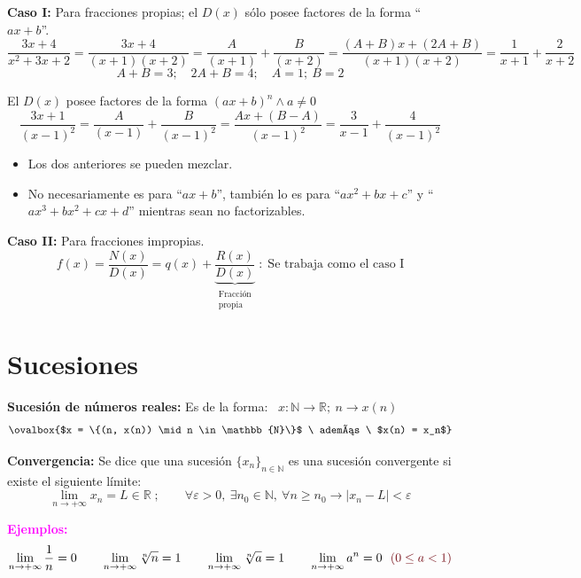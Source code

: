 \documentclass[11pt,a4paper]{article}
\begin{document}
\textcolor{azul}{\textbf{Caso I:}} Para fracciones propias; el $D(x)$ sólo posee factores de la
forma ``$ax + b$''.
\[
\frac{3x+4}{x^2+3x+2} = \frac{3x+4}{(x+1)(x+2)} = \frac{A}{(x+1)} + \frac{B}{(x+2)}
= \frac{(A+B)x + (2A+B)}{(x+1)(x+2)} = \frac{1}{x+1} + \frac{2}{x+2}
\]
\[A + B = 3;\quad 2A + B = 4;\quad A = 1;\ B = 2\]

El $D(x)$ posee factores de la forma $(ax+b)^n \wedge a \neq 0$
\[
\frac{3x+1}{(x-1)^2} = \frac{A}{(x-1)} + \frac{B}{(x-1)^2} = \frac{Ax + (B-A)}{(x-1)^2}
= \frac{3}{x-1} + \frac{4}{(x-1)^2}
\]
\begin{itemize}[label=\checkmark]
  \item Los dos anteriores se pueden mezclar.
  \item No necesariamente es para ``$ax + b$'', también lo es para ``$ax^2 + bx + c$'' y
  ``$ax^3 + bx^2 + cx + d$'' mientras sean no factorizables.
\end{itemize}

\textcolor{azul}{\textbf{Caso II:}} Para fracciones impropias.
\[
f(x) = \frac{N(x)}{D(x)} = q(x) + \underbrace{\frac{R(x)}{D(x)}}_{\substack{\text{Fracción}\\ \text{propia}}}
\;:\; \text{Se trabaja como el caso I}
\]

\newpage
\section{Sucesiones}

\textbf{Sucesión de números reales:} Es de la forma: \
$x: \mathbb{N} \to \mathbb{R};\ n \to x(n)$
\[\ovalbox{$x = \{(n, x(n)) \mid n \in \mathbb{N}\}$ \ además \ $x(n) = x_n$}\]

\textcolor{naranja}{\textbf{Convergencia:}} Se dice que una sucesión $\{x_n\}_{n\in\mathbb{N}}$
es una sucesión convergente si existe el siguiente límite:
\[
\lim_{n\to+\infty} x_n = L \in \mathbb{R}\;; \qquad
\forall \varepsilon > 0,\ \exists n_0 \in \mathbb{N},\ \forall n \geq n_0 \rightarrow |x_n - L| < \varepsilon
\]

\textcolor{magenta}{\textbf{Ejemplos:}}
\[
\lim_{n\to+\infty}\frac{1}{n} = 0 \qquad
\lim_{n\to+\infty}\sqrt[n]{n} = 1 \qquad
\lim_{n\to+\infty}\sqrt[n]{a} = 1 \qquad
\lim_{n\to+\infty}a^n = 0 \ \ \textcolor{rojo!60!black}{(0 \leq a < 1)}
\]
\end{document}
